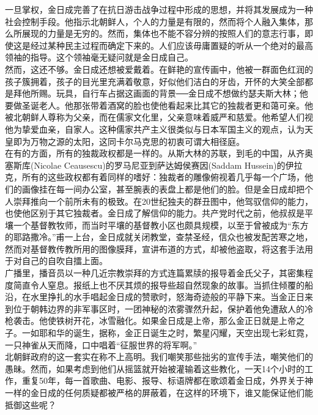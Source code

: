 一旦掌权，金日成完善了在抗日游击战争过程中形成的思想，并将其发展成为一种社会控制手段。他指示北朝鲜人，个人的力量是有限的，然而将个人融入集体，那么所展现的力量是无穷的。然而，集体也不能不容分辨的按照人们的意志行事，即使这是经过某种民主过程而确定下来的。人们应该毋庸置疑的听从一个绝对的最高领袖的指导。这个领袖毫无疑问就是金日成自己。\\

然而，这还不够。金日成还想被爱戴着。在鲜艳的宣传画中，他被一群面色红润的孩子簇拥着，孩子的目光里充满着敬意，好似他们洁白的牙齿，开怀的大笑全部都是拜他所赐。玩具，自行车占据这画面的背景──金日成不想做约瑟夫斯大林；他要做圣诞老人。他那张带着酒窝的脸也使他看起来比其它的独裁者更和蔼可亲。他被北朝鲜人尊称为父亲，而在儒家文化里，父亲意味着威严和慈爱。他希望人们视他为挚爱血亲，自家人。这种儒家共产主义很类似与日本军国主义的观点，认为天皇即为万物之源的太阳，这同卡尔马克思的初衷可谓大相径庭。\\

在有的方面，所有的独裁政权都是一样的。从斯大林的苏联，到毛的中国，从齐奥塞斯库(Nicolae Ceausescu)的罗马尼亚到萨达姆侯赛因(Saddam Hussein)的伊拉克，所有的这些政权都有着同样的嗜好：独裁者的雕像俯视着几乎每一个广场，他们的画像挂在每一间办公室，甚至腕表的表盘上都是他们的脸。但是金日成却把个人崇拜推向一个前所未有的极致。在20世纪独夫的群丑图中，他驾驭信仰的能力，也使他区别于其它独裁者。金日成了解信仰的能力。共产党时代之前，他叔叔是平壤一个基督教牧师，而当时平壤的基督教小区也颇具规模，以至于曾被成为“东方的耶路撒冷。”甫一上台，金日成就关闭教堂，查禁圣经，信众也被发配苦寒之地，然而对基督教传教所用的图像膜拜，宣讲布道的方式，却被他盗取，将这套手法用于对自己的自吹自擂上面。\\

广播里，播音员以一种几近宗教崇拜的方式连篇累牍的报导着金氏父子，其密集程度简直令人窒息。报纸上也不厌其烦的报导些超自然现象的故事。当抓住倾覆的船沿，在水里挣扎的水手唱起金日成的赞歌时，怒海奇迹般的平静下来。当金正日来到位于朝韩边界的非军事区时，一团神秘的浓雾骤然升起，保护着他免遭敌人的冷枪袭击。他使铁树开花，冰雪融化。如果金日成是上帝，那么金正日就是上帝之子。一如耶和华的诞生，据称，金正日诞生之时，繁星闪耀，天空出现七彩虹霓，一只神雀从天而降，口中唱着“征服世界的将军啊。”\\

北朝鲜政府的这一套实在称不上高明。我们嘲笑那些拙劣的宣传手法，嘲笑他们的愚昧。然而，如果考虑到他们从摇篮就开始被灌输着这些教化，一天14个小时的工作，重复50年，每一首歌曲、电影、报导、标语牌都在歌颂着金日成，外界关于神一样的金日成的任何质疑都被严格的屏蔽着，在这样的环境下，谁又能保证他们能抵御这些呢？\\

